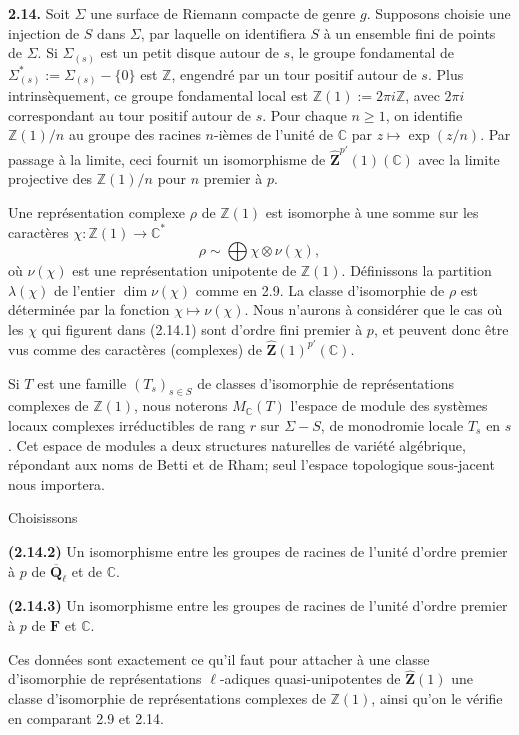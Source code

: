 \documentclass[11pt]{article}
\newcommand{\F}{\mathbf{F}}
\newcommand{\Qbl}{\overline{\mathbf{Q}}_{\ell}}
\newcommand{\Z}{\mathbb{Z}}
\newcommand{\Zhat}{\widehat{\mathbf{Z}}}
\newcommand{\C}{\mathbb{C}}
\newcommand{\para}[1]{\medskip\noindent\textbf{#1}\enspace}
\begin{document}
\para{2.14.} Soit \(\Sigma\) une surface de Riemann compacte de genre \(g\). Supposons choisie une injection de \(S\) dans \(\Sigma\), par laquelle on identifiera \(S\) à un ensemble fini de points de \(\Sigma\). Si \(\Sigma_{(s)}\) est un petit disque autour de \(s\), le groupe fondamental de \(\Sigma^*_{(s)}:=\Sigma_{(s)}-\{0\}\) est \(\Z\), engendré par un tour positif autour de \(s\). Plus intrinsèquement, ce groupe fondamental local est \(\Z(1):=2\pi i\Z\), avec \(2\pi i\) correspondant au tour positif autour de \(s\). Pour chaque \(n\geq 1\), on identifie \(\Z(1)/n\) au groupe des racines \(n\)-ièmes de l'unité de \(\C\) par \(z\mapsto \exp(z/n)\). Par passage à la limite, ceci fournit un isomorphisme de \(\Zhat^{p'}(1)(\C)\) avec la limite projective des \(\Z(1)/n\) pour \(n\) premier à \(p\).

Une représentation complexe \(\rho\) de \(\Z(1)\) est isomorphe à une somme sur les caractères \(\chi:\Z(1)\to\C^*\)
\begin{equation}
\rho\sim\bigoplus \chi\otimes \nu(\chi),
\tag{2.14.1}
\end{equation}
où \(\nu(\chi)\) est une représentation unipotente de \(\Z(1)\). Définissons la partition \(\lambda(\chi)\) de l'entier \(\dim \nu(\chi)\) comme en 2.9. La classe d'isomorphie de \(\rho\) est déterminée par la fonction \(\chi\mapsto\nu(\chi)\). Nous n'aurons à considérer que le cas où les \(\chi\) qui figurent dans (2.14.1) sont d'ordre fini premier à \(p\), et peuvent donc être vus comme des caractères (complexes) de \(\Zhat(1)^{p'}(\C)\).

Si \(T\) est une famille \((T_s)_{s\in S}\) de classes d'isomorphie de représentations complexes de \(\Z(1)\), nous noterons \(M_\C(T)\) l'espace de module des systèmes locaux complexes irréductibles de rang \(r\) sur \(\Sigma-S\), de monodromie locale \(T_s\) en \(s\). Cet espace de modules a deux structures naturelles de variété algébrique, répondant aux noms de Betti et de Rham; seul l'espace topologique sous-jacent nous importera.

Choisissons

\para{(2.14.2)} Un isomorphisme entre les groupes de racines de l'unité d'ordre premier à \(p\) de \(\Qbl\) et de \(\C\).

\para{(2.14.3)} Un isomorphisme entre les groupes de racines de l'unité d'ordre premier à \(p\) de \(\F\) et \(\C\).

Ces données sont exactement ce qu'il faut pour attacher à une classe d'isomorphie de représentations \(\ell\)-adiques quasi-unipotentes de \(\Zhat(1)\) une classe d'isomorphie de représentations complexes de \(\Z(1)\), ainsi qu'on le vérifie en comparant 2.9 et 2.14.
\end{document}
